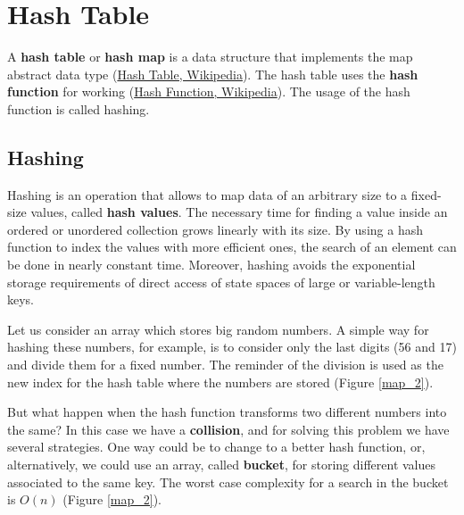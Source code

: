 \section{Hash Table}
A \textbf{hash table} or \textbf{hash map} is a data structure that implements the map abstract data type \cite{wikihashtable} (\href{https://en.wikipedia.org/wiki/Hash_table}{Hash Table, Wikipedia}). The hash table uses the \textbf{hash function} for working \cite{wikihashfunction} (\href{https://en.wikipedia.org/wiki/Hash_function}{Hash Function, Wikipedia}). The usage of the hash function is called hashing.

\subsection{Hashing}
Hashing is an operation that allows to map data of an arbitrary size to a fixed-size values, called \textbf{hash values}. The necessary time for finding a value inside an ordered or unordered collection grows linearly with its size. By using a hash function to index the values with more efficient ones, the search of an element can be done in nearly constant time. Moreover, hashing avoids the exponential storage requirements of direct access of state spaces of large or variable-length keys.

Let us consider an array which stores big random numbers. A simple way for hashing these numbers, for example, is to consider only the last digits (56 and 17) and divide them for a fixed number. The reminder of the division is used as the new index for the hash table where the numbers are stored (Figure \ref{map_2}).

But what happen when the hash function transforms two different numbers into the same? In this case we have a \textbf{collision}, and for solving this problem we have several strategies. One way could be to change to a better hash function, or, alternatively, we could use an array, called \textbf{bucket}, for storing different values associated to the same key. The worst case complexity for a search in the bucket is \(O(n)\) (Figure \ref{map_2}).

